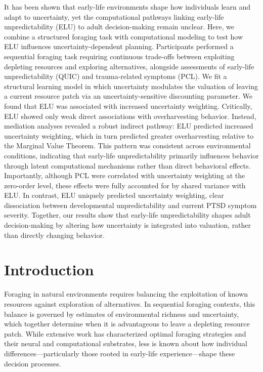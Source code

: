 \documentclass[12pt]{article}
\begin{document}
It has been shown that early-life environments shape how individuals learn and adapt to uncertainty, yet the computational pathways linking early-life unpredictability (ELU) to adult decision-making remain unclear. Here, we combine a structured foraging task with computational modeling to test how ELU influences uncertainty-dependent planning. Participants performed a sequential foraging task requiring continuous trade-offs between exploiting depleting resources and exploring alternatives, alongside assessments of early-life unpredictability (QUIC) and trauma-related symptoms (PCL). We fit a structural learning model in which uncertainty modulates the valuation of leaving a current resource patch via an uncertainty-sensitive discounting parameter. We found that ELU was associated with increased uncertainty weighting. Critically, ELU showed only weak direct associations with overharvesting behavior. Instead, mediation analyses revealed a robust indirect pathway: ELU predicted increased uncertainty weighting, which in turn predicted greater overharvesting relative to the Marginal Value Theorem. This pattern was consistent across environmental conditions, indicating that early-life unpredictability primarily influences behavior through latent computational mechanisms rather than direct behavioral effects. Importantly, although PCL were correlated with uncertainty weighting at the zero-order level, these effects were fully accounted for by shared variance with ELU. In contrast, ELU uniquely predicted uncertainty weighting, clear dissociation between developmental unpredictability and current PTSD symptom severity. Together, our results show that early-life unpredictability shapes adult decision-making by altering how uncertainty is integrated into valuation, rather than directly changing behavior.


\section*{Introduction}

Foraging in natural environments requires balancing the exploitation of known resources against exploration of alternatives. In sequential foraging contexts, this balance is governed by estimates of environmental richness and uncertainty, which together determine when it is advantageous to leave a depleting resource patch. While extensive work has characterized optimal foraging strategies and their neural and computational substrates, less is known about how individual differences—particularly those rooted in early-life experience—shape these decision processes.
\end{document}
